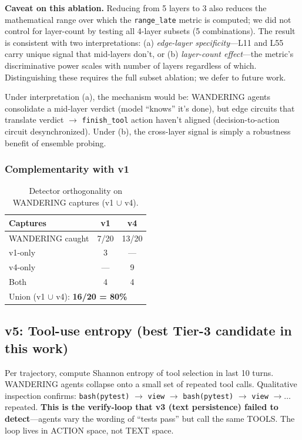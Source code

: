 \documentclass[11pt]{article}
\begin{document}
\textbf{Caveat on this ablation.} Reducing from 5 layers to 3 also reduces the mathematical range over which the \texttt{range\_late} metric is computed; we did not control for layer-count by testing all 4-layer subsets (5 combinations). The result is consistent with two interpretations: (a) \emph{edge-layer specificity}---L11 and L55 carry unique signal that mid-layers don't, or (b) \emph{layer-count effect}---the metric's discriminative power scales with number of layers regardless of which. Distinguishing these requires the full subset ablation; we defer to future work.

Under interpretation (a), the mechanism would be: WANDERING agents consolidate a mid-layer verdict (model ``knows'' it's done), but edge circuits that translate verdict $\rightarrow$ \texttt{finish\_tool} action haven't aligned (decision-to-action circuit desynchronized). Under (b), the cross-layer signal is simply a robustness benefit of ensemble probing.

\subsubsection{Complementarity with v1}
\begin{table}[ht]
\centering
\caption{Detector orthogonality on WANDERING captures (v1 $\cup$ v4).}\label{tab:venn}
\begin{tabular}{lcc}
\toprule
Captures & v1 & v4 \\
\midrule
WANDERING caught & 7/20 & 13/20 \\
v1-only & 3 & --- \\
v4-only & --- & 9 \\
Both & 4 & 4 \\
\multicolumn{3}{l}{Union (v1 $\cup$ v4): \textbf{16/20 = 80\%}} \\
\bottomrule
\end{tabular}
\end{table}

\subsection{v5: Tool-use entropy (best Tier-3 candidate in this work)}\label{sec:v5}
Per trajectory, compute Shannon entropy of tool selection in last 10 turns. WANDERING agents collapse onto a small set of repeated tool calls. Qualitative inspection confirms: \texttt{bash(pytest)} $\to$ \texttt{view} $\to$ \texttt{bash(pytest)} $\to$ \texttt{view} $\to \ldots$ repeated. \textbf{This is the verify-loop that v3 (text persistence) failed to detect}---agents vary the wording of ``tests pass'' but call the same TOOLS. The loop lives in ACTION space, not TEXT space.
\end{document}

